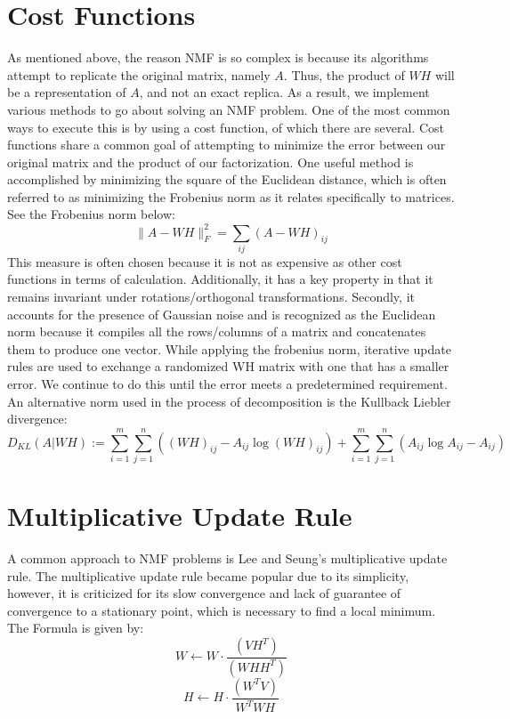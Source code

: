 \documentclass[
10pt, %
a4paper, %
oneside, %
headinclude,footinclude, %
BCOR5mm, %
]{scrartcl}
\begin{document}
\section{Cost Functions}
As mentioned above, the reason NMF is so complex is because its algorithms attempt to replicate the original matrix, namely $A$. Thus, the product of $WH$ will be a representation of $A$, and not an exact replica. As a result, we implement various methods to go about solving an NMF problem. One of the most common ways to execute this is by using a cost function, of which there are several. Cost functions share a common goal of attempting to minimize the error between our original matrix and the product of our factorization.
One useful method is accomplished by minimizing the square of the Euclidean distance,  which is often referred to as minimizing the Frobenius norm as it relates specifically to matrices. See the Frobenius norm below:
$$\lVert A-WH\rVert^{2}_{F}=\sum_{ij}(A-WH)_{ij}$$
This measure is often chosen because it is not as expensive as other cost functions in terms of calculation. Additionally, it has a key property in that it remains invariant under rotations/orthogonal transformations. Secondly, it accounts for the presence of Gaussian noise and is recognized as the Euclidean norm because it compiles all the rows/columns of a matrix and concatenates them to produce one vector.  While applying the frobenius norm, iterative update rules are used to exchange a randomized WH matrix with one that has a smaller error. We continue to do this until the error meets a predetermined requirement.
An alternative norm used in the process of decomposition is the Kullback Liebler divergence:
$$D_{KL}(A\vert WH):=\sum_{i=1}^{m}\sum_{j=1}^{n}((WH)_{ij}-A_{ij}\log(WH)_{ij})+\sum_{i=1}^{m}\sum_{j=1}^{n}(A_{ij}\log A_{ij}-A_{ij})$$



\section{Multiplicative Update Rule}

A common approach to NMF problems is Lee and Seung's multiplicative update rule. The multiplicative update rule became popular due to its simplicity, however, it is criticized for its slow convergence and lack of guarantee of convergence to a stationary point, which is necessary to find a local minimum.
The Formula is given by:
$$W\leftarrow W\cdot\frac{(VH^{T})}{(WHH^{T})}$$
$$H\leftarrow H\cdot\frac{(W^{T}V)}{W^{T}WH}$$
\end{document}
